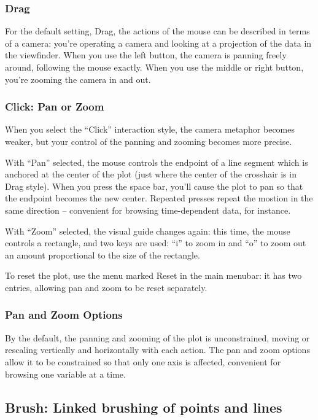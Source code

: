 \documentclass[11pt]{article}
\begin{document}
\subsubsection{Drag}

For the default setting, Drag, the actions of the mouse can be
described in terms of a camera:  you're operating a camera and
looking at a projection of the data in the viewfinder.  When you use
the left button, the camera is panning freely around, following the
mouse exactly.  When you use the middle or right button, you're
zooming the camera in and out.

\subsubsection{Click: Pan or Zoom}

When you select the ``Click'' interaction style, the camera metaphor
becomes weaker, but your control of the panning and zooming becomes
more precise.

With ``Pan'' selected, the mouse controls the endpoint of a line
segment which is anchored at the center of the plot (just where the
center of the crosshair is in Drag style).  When you press the space
bar, you'll cause the plot to pan so that the endpoint becomes the
new center.  Repeated presses repeat the mostion in the same
direction -- convenient for browsing time-dependent data, for
instance.

With ``Zoom'' selected, the visual guide changes again:  this time,
the mouse controls a rectangle, and two keys are used:  ``i'' to
zoom in and ``o'' to zoom out an amount proportional to the size
of the rectangle.

To reset the plot, use the menu marked Reset in the main menubar:
it has two entries, allowing pan and zoom to be reset separately.

\subsubsection{Pan and Zoom Options}

By the default, the panning and zooming of the plot is unconstrained,
moving or rescaling vertically and horizontally with each action.
The pan and zoom options allow it to be constrained so that only
one axis is affected, convenient for browsing one variable at a time.

\subsection{Brush: Linked brushing of points and lines}
\label{slbl:Color}
\end{document}
